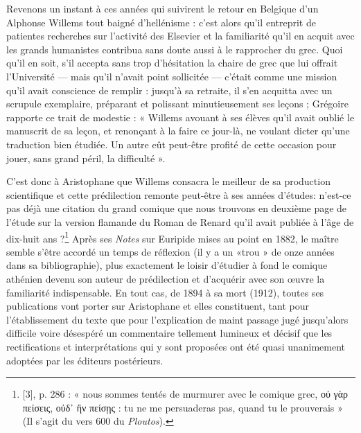 \documentclass{book}%
\newcommand{\italique}[1]{\textit{#1}}%
\newcommand{\note}[1]{\footnote{#1}}
\begin{document}
Revenons un instant à ces années qui suivirent le retour en Belgique d'un Alphonse Willems tout baigné d'hellénisme : c'est alors qu'il entreprit de patientes recherches sur l'activité des Elsevier et la familiarité qu'il en acquit avec les grands humanistes contribua sans doute aussi à le rapprocher du grec. 
Quoi qu'il en soit, s'il accepta sans trop d'hésitation la chaire de grec que lui offrait l'Université — mais qu'il n'avait point sollicitée — c'était comme une mission qu'il avait conscience de remplir : jusqu'à sa retraite, il s'en acquitta avec un scrupule exemplaire, préparant et polissant minutieusement ses leçons ; Grégoire rapporte ce trait de modestie : « Willems avouant à ses élèves qu'il avait oublié le manuscrit de sa leçon, et renonçant à la faire ce jour-là, ne voulant dicter qu'une traduction bien étudiée. Un autre eût peut-être profité de cette occasion pour jouer, sans grand péril, la difficulté ». 

C'est donc à Aristophane que Willems consacra le meilleur de sa production scientifique et cette prédilection remonte peut-être à ses années d'études: n'est-ce pas déjà une citation du grand comique que nous trouvons en deuxième page de l'étude sur la version flamande du Roman de Renard qu'il avait publiée à l'âge de dix-huit ans ?\note{[3], p. 286 : « nous sommes tentés de murmurer avec le comique grec, οὐ γὰρ πείσεις, οὐδ᾽ ἢν πείσῃς : tu ne me persuaderas pas, quand tu le prouverais » (Il s'agit du vers 600 du \italique{Ploutos}).}
Après ses \italique{Notes} sur Euripide mises au point en 1882, le maître semble s'être accordé un temps de réflexion (il y a un «trou » de onze années dans sa bibliographie), plus exactement le loisir d'étudier à fond le comique athénien devenu son auteur de prédilection et d'acquérir avec son œuvre la familiarité indispensable.
En tout cas, de 1894 à sa mort (1912), toutes ses publications vont porter sur Aristophane et elles constituent, tant pour l'établissement du texte que pour l'explication de maint passage jugé jusqu'alors difficile voire désespéré un commentaire tellement lumineux et décisif que les rectifications et interprétations qui y sont proposées ont été quasi unanimement adoptées par les éditeurs postérieurs. 
\end{document}
